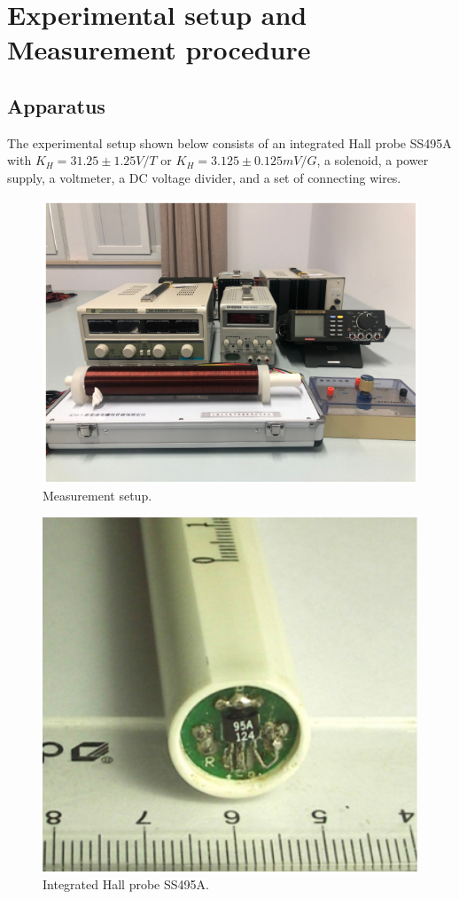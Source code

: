 \documentclass[12pt, a4paper]{article}
\begin{document}
\section{Experimental setup and Measurement procedure}
\subsection{Apparatus}
The experimental setup shown below consists of an integrated Hall probe SS495A
with $ K_H = 31.25 \pm 1.25 V/T $ or $ K_H = 3.125 \pm 0.125 mV/G $, 
a solenoid, a power supply, a voltmeter, a DC voltage divider, and a set of 
connecting wires.
\begin{figure}[H]
	\centering
	\includegraphics[scale = 0.6]{p3.png}
	\caption{Measurement setup.}
\end{figure}
\begin{figure}[H]
	\centering
	\includegraphics[scale = 0.6]{p4.png}
	\caption{Integrated Hall probe SS495A.}
\end{figure}
\end{document}
